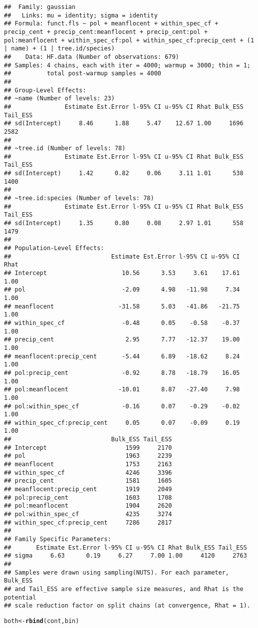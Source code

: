 \documentclass{article}\usepackage[]{graphicx}\usepackage[]{color}
\makeatletter
\newcommand{\hlstd}[1]{\textcolor[rgb]{0.345,0.345,0.345}{#1}}%
\newcommand{\hlkwb}[1]{\textcolor[rgb]{0.69,0.353,0.396}{#1}}%
\newcommand{\hlkwd}[1]{\textcolor[rgb]{0.737,0.353,0.396}{\textbf{#1}}}%
\newenvironment{kframe}{%
 \def\at@end@of@kframe{}%
 \ifinner\ifhmode%
  \def\at@end@of@kframe{\end{minipage}}%
  \begin{minipage}{\columnwidth}%
 \fi\fi%
 \def\FrameCommand##1{\hskip\@totalleftmargin \hskip-\fboxsep
 \colorbox{shadecolor}{##1}\hskip-\fboxsep
     \hskip-\linewidth \hskip-\@totalleftmargin \hskip\columnwidth}%
 \MakeFramed {\advance\hsize-\width
   \@totalleftmargin\z@ \linewidth\hsize
   \@setminipage}}%
 {\par\unskip\endMakeFramed%
 \at@end@of@kframe}
\newenvironment{knitrout}{}{} %
\makeatother
\begin{document}
\begin{knitrout}
\begin{kframe}
\begin{alltt}
\end{alltt}
\begin{verbatim}
##  Family: gaussian 
##   Links: mu = identity; sigma = identity 
## Formula: funct.fls ~ pol + meanflocent + within_spec_cf + precip_cent + precip_cent:meanflocent + precip_cent:pol + pol:meanflocent + within_spec_cf:pol + within_spec_cf:precip_cent + (1 | name) + (1 | tree.id/species) 
##    Data: HF.data (Number of observations: 679) 
## Samples: 4 chains, each with iter = 4000; warmup = 3000; thin = 1;
##          total post-warmup samples = 4000
## 
## Group-Level Effects: 
## ~name (Number of levels: 23) 
##               Estimate Est.Error l-95% CI u-95% CI Rhat Bulk_ESS Tail_ESS
## sd(Intercept)     8.46      1.88     5.47    12.67 1.00     1696     2582
## 
## ~tree.id (Number of levels: 78) 
##               Estimate Est.Error l-95% CI u-95% CI Rhat Bulk_ESS Tail_ESS
## sd(Intercept)     1.42      0.82     0.06     3.11 1.01      538     1400
## 
## ~tree.id:species (Number of levels: 78) 
##               Estimate Est.Error l-95% CI u-95% CI Rhat Bulk_ESS Tail_ESS
## sd(Intercept)     1.35      0.80     0.08     2.97 1.01      558     1479
## 
## Population-Level Effects: 
##                            Estimate Est.Error l-95% CI u-95% CI Rhat
## Intercept                     10.56      3.53     3.61    17.61 1.00
## pol                           -2.09      4.98   -11.98     7.34 1.00
## meanflocent                  -31.58      5.03   -41.86   -21.75 1.00
## within_spec_cf                -0.48      0.05    -0.58    -0.37 1.00
## precip_cent                    2.95      7.77   -12.37    19.00 1.00
## meanflocent:precip_cent       -5.44      6.89   -18.62     8.24 1.00
## pol:precip_cent               -0.92      8.78   -18.79    16.05 1.00
## pol:meanflocent              -10.01      8.87   -27.40     7.98 1.00
## pol:within_spec_cf            -0.16      0.07    -0.29    -0.02 1.00
## within_spec_cf:precip_cent     0.05      0.07    -0.09     0.19 1.00
##                            Bulk_ESS Tail_ESS
## Intercept                      1599     2170
## pol                            1963     2239
## meanflocent                    1753     2163
## within_spec_cf                 4246     3396
## precip_cent                    1581     1605
## meanflocent:precip_cent        1919     2049
## pol:precip_cent                1603     1708
## pol:meanflocent                1904     2620
## pol:within_spec_cf             4235     3274
## within_spec_cf:precip_cent     7286     2817
## 
## Family Specific Parameters: 
##       Estimate Est.Error l-95% CI u-95% CI Rhat Bulk_ESS Tail_ESS
## sigma     6.63      0.19     6.27     7.00 1.00     4120     2763
## 
## Samples were drawn using sampling(NUTS). For each parameter, Bulk_ESS
## and Tail_ESS are effective sample size measures, and Rhat is the potential
## scale reduction factor on split chains (at convergence, Rhat = 1).
\end{verbatim}
\begin{alltt}
\hlstd{both}\hlkwb{<-}\hlkwd{rbind}\hlstd{(cont,bin)}


\end{alltt}
\end{kframe}
\end{knitrout}
\end{document}
